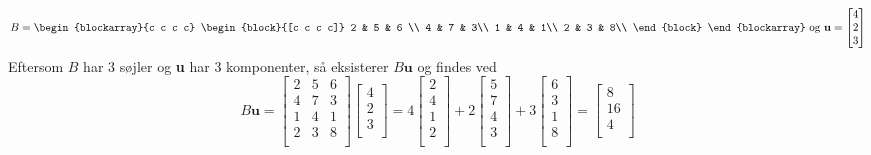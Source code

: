 \begin{eks}\label{Matrix-vektor}
\begin{center} 
$$B=
\begin{blockarray}{c c c c}
\begin{block}{[c c c c]}
2 & 5 & 6 \\
4 & 7 & 3\\
1 & 4 & 1\\
2 & 3 & 8\\
\end{block}
\end{blockarray}
%
\text{ og }
%
\textbf{u}=
\begin{bmatrix}
4 \\
2 \\
3 \\ 
\end{bmatrix}
$$
Eftersom $B$ har 3 søjler og \textbf{u} har 3 komponenter, så eksisterer $B\textbf{u}$ og findes ved
$$
B\textbf{u}=
\begin{bmatrix}
2 & 5 & 6 \\
4 & 7 & 3\\
1 & 4 & 1\\
2 & 3 & 8\\
\end{bmatrix}
\begin{bmatrix}
4 \\
2 \\
3 \\ 
\end{bmatrix}
=4
\begin{bmatrix}
2\\
4\\
1\\
2\\
\end{bmatrix}
+2
\begin{bmatrix}
5\\
7\\
4\\
3\\
\end{bmatrix}
+3
\begin{bmatrix}
6\\
3\\
1\\
8\\
\end{bmatrix}
=
\begin{bmatrix}
8\\
16\\
4\\

\end{bmatrix}$$
\end{center}
\end{eks}
